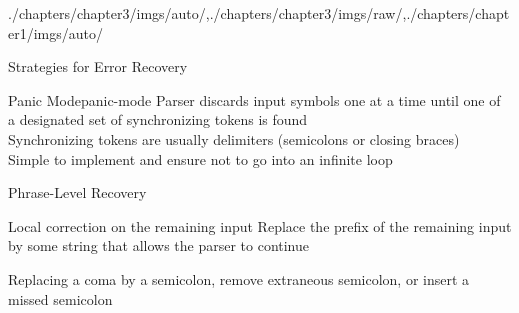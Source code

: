 \begin{graphicspathcontext}{{./chapters/chapter3/imgs/auto/},{./chapters/chapter3/imgs/raw/},{./chapters/chapter1/imgs/auto/}}
\begin{bibunit}[apalike]
\begin{frame}{Strategies for Error Recovery}
	\vspace{.25cm}
	\begin{rightarrowsequence}
	\end{rightarrowsequence}	
	\vspace{.5cm}
	\begin{center}
	\hspace{2cm}
	\end{center}
\end{frame}

\begin{leftlawnframe}{Panic Mode}{panic-mode}
	Parser discards input symbols one at a time until one of a designated set of synchronizing tokens is found \\[.5cm]
	Synchronizing tokens are usually delimiters (semicolons or closing braces) \\[.5cm]
	Simple to implement and ensure not to go into an infinite loop
\end{leftlawnframe}

\begin{frame}{Phrase-Level Recovery}
	\begin{block}{Local correction on the remaining input}
		Replace the prefix of the remaining input by some string that allows the parser to continue
	\end{block}
	\begin{examples}
		Replacing a coma by a semicolon, remove extraneous semicolon, or insert a missed semicolon
	\end{examples}
	\vspace{1cm}
\end{frame}


\end{bibunit}
\end{graphicspathcontext}
